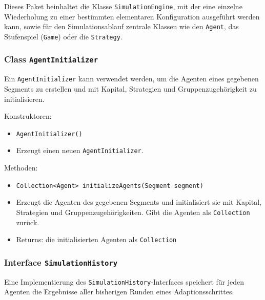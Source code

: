 \documentclass[parskip=full,11pt]{scrartcl}
\begin{document}
Dieses Paket beinhaltet die Klasse \texttt{SimulationEngine}, mit der eine einzelne Wiederholung zu einer bestimmten elementaren Konfiguration ausgeführt werden kann, sowie für den Simulationsablauf zentrale Klassen wie den \texttt{Agent}, das Stufenspiel (\texttt{Game}) oder die \texttt{Strategy}.

\subsubsection{Class \texttt{AgentInitializer}}
Ein \texttt{AgentInitializer} kann verwendet werden, um die Agenten eines gegebenen Segments zu erstellen und mit Kapital, Strategien und Gruppenzugehörigkeit zu initialisieren.

Konstruktoren:
\begin{itemize}\itemsep -10pt
\item \texttt{AgentInitializer()}
\item[] Erzeugt einen neuen \texttt{AgentInitializer}.
\end{itemize}

Methoden:
\begin{itemize}\itemsep -10pt
\item \texttt{Collection<Agent> initializeAgents(Segment segment)}
\item[] Erzeugt die Agenten des gegebenen Segments und initialisiert sie mit Kapital, Strategien und Gruppenzugehörigkeiten. Gibt die Agenten als \texttt{Collection} zurück.
\item[] Returns: die initialisierten Agenten als \texttt{Collection}
\end{itemize}

\subsubsection{Interface \texttt{SimulationHistory}}
Eine Implementierung des \texttt{SimulationHistory}-Interfaces speichert für jeden Agenten die Ergebnisse aller bisherigen Runden eines Adaptionsschrittes.
\end{document}

